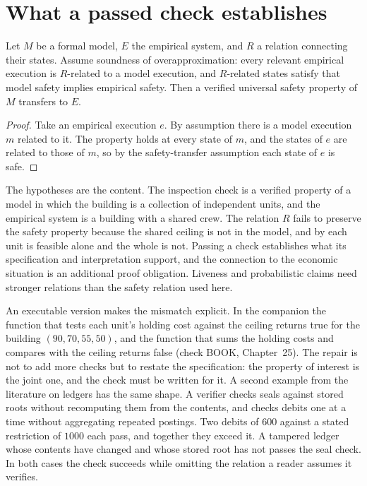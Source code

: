 \section{What a passed check establishes}

\begin{theorem}\label{thm:P17}
Let $M$ be a formal model, $E$ the empirical system, and $R$ a relation connecting their states. Assume soundness of overapproximation: every relevant empirical execution is $R$-related to a model execution, and $R$-related states satisfy that model safety implies empirical safety. Then a verified universal safety property of $M$ transfers to $E$.
\end{theorem}

\begin{proof}
Take an empirical execution $e$. By assumption there is a model execution $m$ related to it. The property holds at every state of $m$, and the states of $e$ are related to those of $m$, so by the safety-transfer assumption each state of $e$ is safe.
\end{proof}

The hypotheses are the content. The inspection check is a verified property of a model in which the building is a collection of independent units, and the empirical system is a building with a shared crew. The relation $R$ fails to preserve the safety property because the shared ceiling is not in the model, and by  each unit is feasible alone and the whole is not. Passing a check establishes what its specification and interpretation support, and the connection to the economic situation is an additional proof obligation. Liveness and probabilistic claims need stronger relations than the safety relation used here.

An executable version makes the mismatch explicit. In the companion the function that tests each unit's holding cost against the ceiling returns true for the building $(90,70,55,50)$, and the function that sums the holding costs and compares with the ceiling returns false (check BOOK, Chapter~25). The repair is not to add more checks but to restate the specification: the property of interest is the joint one, and the check must be written for it. A second example from the literature on ledgers has the same shape. A verifier checks seals against stored roots without recomputing them from the contents, and checks debits one at a time without aggregating repeated postings. Two debits of $600$ against a stated restriction of $1000$ each pass, and together they exceed it. A tampered ledger whose contents have changed and whose stored root has not passes the seal check. In both cases the check succeeds while omitting the relation a reader assumes it verifies.

